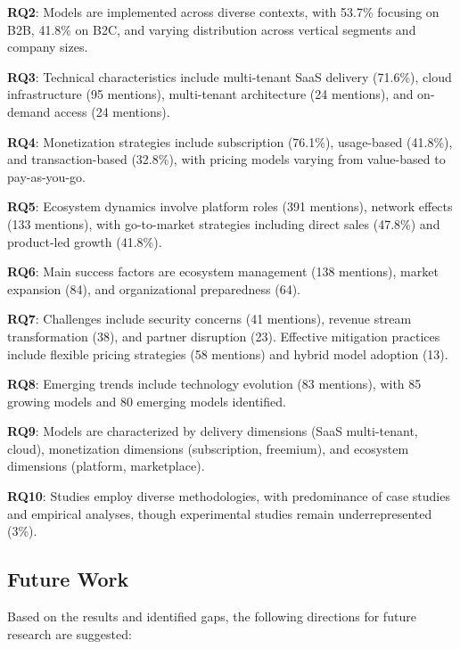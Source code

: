 \documentclass[journal]{IEEEtran}
\begin{document}
\textbf{RQ2}: Models are implemented across diverse contexts, with 53.7\% focusing on B2B, 41.8\% on B2C, and varying distribution across vertical segments and company sizes.

\textbf{RQ3}: Technical characteristics include multi-tenant SaaS delivery (71.6\%), cloud infrastructure (95 mentions), multi-tenant architecture (24 mentions), and on-demand access (24 mentions).

\textbf{RQ4}: Monetization strategies include subscription (76.1\%), usage-based (41.8\%), and transaction-based (32.8\%), with pricing models varying from value-based to pay-as-you-go.

\textbf{RQ5}: Ecosystem dynamics involve platform roles (391 mentions), network effects (133 mentions), with go-to-market strategies including direct sales (47.8\%) and product-led growth (41.8\%).

\textbf{RQ6}: Main success factors are ecosystem management (138 mentions), market expansion (84), and organizational preparedness (64).

\textbf{RQ7}: Challenges include security concerns (41 mentions), revenue stream transformation (38), and partner disruption (23). Effective mitigation practices include flexible pricing strategies (58 mentions) and hybrid model adoption (13).

\textbf{RQ8}: Emerging trends include technology evolution (83 mentions), with 85 growing models and 80 emerging models identified.

\textbf{RQ9}: Models are characterized by delivery dimensions (SaaS multi-tenant, cloud), monetization dimensions (subscription, freemium), and ecosystem dimensions (platform, marketplace).

\textbf{RQ10}: Studies employ diverse methodologies, with predominance of case studies and empirical analyses, though experimental studies remain underrepresented (3\%).

\subsection{Future Work}

Based on the results and identified gaps, the following directions for future research are suggested:
\end{document}
